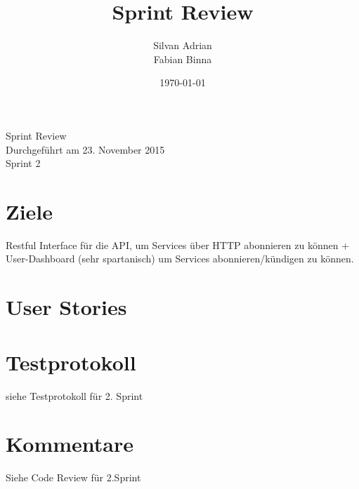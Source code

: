 \documentclass[11pt]{scrartcl}
\title{Sprint Review}
\author{Silvan Adrian \\ Fabian Binna}
\date{\today{}}
\begin{document}
\def\arraystretch{1.5}
\begin{titlepage}
\begin{center}
\vspace{10em}

\vspace{10em}
\end{center}
\begin{center}
\huge {Sprint Review}\\

Durchgeführt am 23. November 2015\\
Sprint 2
\end{center}

\end{titlepage}

\newpage
\tableofcontents
\newpage

\section{Ziele}
Restful Interface für die API, um Services über HTTP 
abonnieren zu können + User-Dashboard (sehr spartanisch)  um Services 
abonnieren/kündigen zu können.

\section{User Stories}





\newpage

\section{Testprotokoll}

siehe Testprotokoll für 2. Sprint

\section{Kommentare}

Siehe Code Review für 2.Sprint
\end{document}
